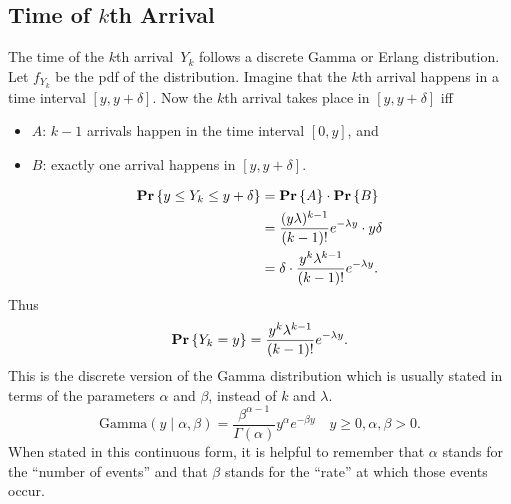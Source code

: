 \subsection{Time of $k$th Arrival}
The time of the $k$th arrival~$Y_k$ follows a discrete Gamma or Erlang distribution. Let $f_{Y_k}$ be the pdf of the 
distribution. Imagine that the $k$th arrival happens in a time interval $[y, y + \delta]$. Now the $k$th arrival takes place 
in $[y, y + \delta]$ iff 
\begin{itemize}
    \item $A$: $k - 1$ arrivals happen in the time interval $[0, y]$, and 
    \item $B$: exactly one arrival happens in $[y, y + \delta]$. 
\end{itemize}
\begin{align*}
    \mathbf{Pr} \left \{ y \leq Y_k \leq y + \delta \right \} & = \mathbf{Pr} \left \{ A \right \} \cdot \mathbf{Pr} \left \{ B \right \} \\
        & = \frac{(y \lambda)^{k - 1}}{(k - 1)!} e^{- \lambda y} \cdot y \delta \\
        & = \delta \cdot \frac{y^k \lambda^{k - 1}}{(k - 1)!} e^{- \lambda y}.  
\end{align*}  
Thus 
\[
    \mathbf{Pr} \left \{ Y_k = y \right \} = \frac{y^k \lambda^{k - 1}}{(k - 1)!} e^{- \lambda y}.
\]
This is the discrete version of the Gamma distribution which is usually stated in terms of the parameters $\alpha$ and $\beta$, instead of $k$ and $\lambda$. 
\[
    \text{Gamma}(y \mid \alpha, \beta) =  
        \frac{\beta^{\alpha - 1}}{\Gamma(\alpha)} y^{\alpha} e^{- \beta y} \quad y \geq 0, \alpha, \beta > 0.
\]
When stated in this continuous form, it is helpful to remember that $\alpha$ stands for the ``number of events'' and 
that $\beta$ stands for the ``rate'' at which those events occur.  
